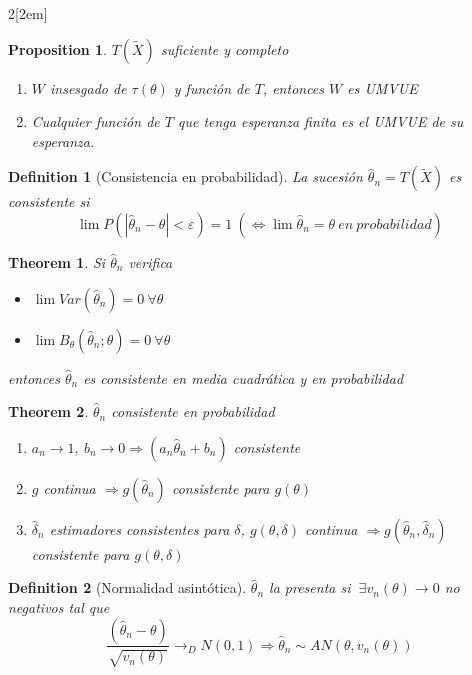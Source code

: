 \documentclass[leqno]{article}
\newtheorem*{theorem}{Theorem}
\newtheorem*{proposition}{Proposition}
\newtheorem*{definition}{Definition}
\begin{document}
\begin{multicols}{2}[\columnsep2em]
\begin{proposition}$T(\tilde{X})$ suficiente y completo
  \begin{enumerate}[topsep=-6pt, itemsep=0pt]
    \item $W$ insesgado de  $\tau (\theta )$ y función de $T$, entonces  $W$ es UMVUE 
	\item Cualquier función de  $T$ que tenga esperanza finita es el UMVUE de su esperanza.
  \end{enumerate}
\end{proposition}







\begin{definition}[Consistencia en probabilidad] La sucesión $\hat{\theta}_n = T(\tilde{X})$ es consistente si 
\[
\lim P(|\hat{\theta }_n-\theta |<\varepsilon ) = 1 \ (\iff \lim \hat{\theta }_n = \theta \ en \ probabilidad)
\] 
\end{definition}

\begin{theorem} Si $\hat{\theta }_n$ verifica
  \begin{itemize}[topsep=-6pt, itemsep=0pt]
    \item $\lim Var(\hat{\theta }_n) = 0 \ \forall \theta$
	\item $\lim B_\theta(\hat{\theta }_n;\theta) = 0 \ \forall \theta $
  \end{itemize}
entonces $\hat{\theta}_n$ es consistente en media cuadrática y en probabilidad
\end{theorem}

\begin{theorem} $\hat{\theta }_n$ consistente en probabilidad
  \begin{enumerate}[topsep=-6pt, itemsep=0pt]
    \item $a_n \to  1, \ b_n \to  0 \Rightarrow (a_n \hat{\theta }_n + b_n)$ consistente
	\item $g$ continua $\Rightarrow g(\hat{\theta}_n)$ consistente para $g(\theta)$
	\item $\hat{\delta}_n$ estimadores consistentes para $\delta$, $g(\theta , \delta)$ continua  $\Rightarrow g(\hat{\theta }_n, \hat{\delta}_n)$ consistente para $g(\theta , \delta)$
  \end{enumerate}
\end{theorem}

\begin{definition}[Normalidad asintótica]  $\hat{\theta }_n$ la presenta si $\ \exists v_n(\theta ) \to  0$ no negativos tal que
  \[
	\frac{(\hat{\theta }_n-\theta )}{\sqrt{v_n(\theta )} } \to_D N(0,1) \Rightarrow \hat{\theta }_n \sim AN(\theta , v_n(\theta ))
  \] 
\end{definition}


\end{multicols}
\end{document}
